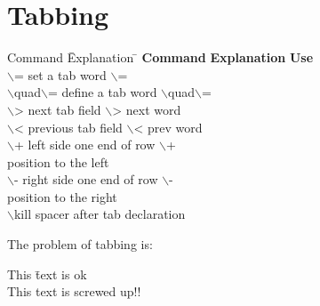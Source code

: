 \documentclass[a4paper,10pt]{scrartcl}
\begin{document}
\section{Tabbing}
\begin{tabbing}
Command \quad\= 
Explanation \qquad\qquad\= 
\kill
\textbf{Command} \> \textbf{Explanation}  \> \textbf{Use} \\
$\backslash$= \> set a tab \> word $\backslash$= \\
$\backslash$quad$\backslash$=  \> define a tab \> word $\backslash$quad$\backslash$= \\ \newline
$\backslash$> \> next tab field \> $\backslash$> next word \\
$\backslash$< \> previous tab field \> $\backslash$< prev word \\
$\backslash$+ \> left side one \> end of row $\backslash$+ \+ \\
position to the left \-\\
$\backslash$- \> right side one \> end of row $\backslash$- \+\\
position to the right \- \\
$\backslash$kill \> spacer \> after tab declaration\\
\end{tabbing}

The problem of tabbing is:
\begin{tabbing}
This \= text is ok \\
This text is \> screwed up!!
\newline
\end{tabbing}
\end{document}
